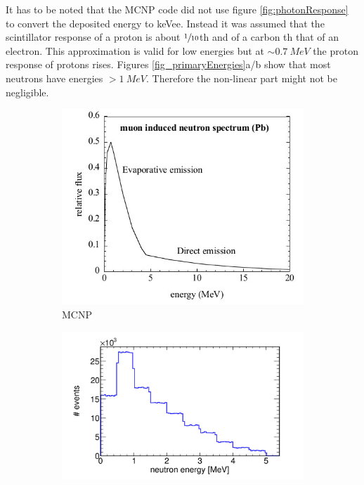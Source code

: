 \documentclass[12pt]{article}
\begin{document}
 It has to be noted that the MCNP code did not use figure \ref{fig:photonResponse} to convert the deposited energy to keVee. Instead it was assumed that the scintillator response of a proton is about $\sfrac{1}{10}$\hspace{2pt}th and of a carbon \hspace{2pt}th that of an electron. This approximation is valid for low energies but at $\sim\SI{0.7}{MeV}$ the proton response of protons rises. 
 Figures \ref{fig_primaryEnergies}a/b show that most neutrons have energies $>\SI{1}{MeV}$. Therefore the non-linear part might not be negligible.
  \begin{figure}[htbp]
  	\begin{subfigure}[t]{0.4\textwidth}
  		\centering
  		\includegraphics[width=\textwidth]{./pics/primaryEnergy_orig.jpg}
  		\caption{MCNP}
  		\label{fig:primaryEnergyMCNP}
  	\end{subfigure}
  	\begin{subfigure}[t]{0.55\textwidth}
  		\centering
  		\includegraphics[width=\textwidth]{./pics/primaryEnergy.jpg}

\end{subfigure}
\end{figure}
\end{document}
